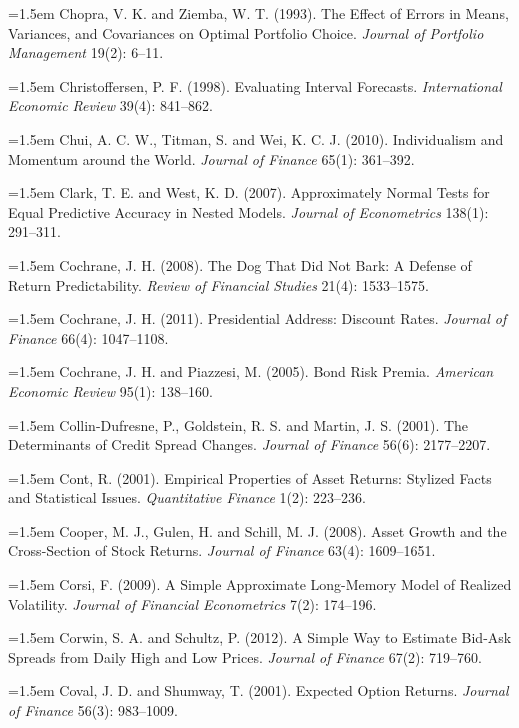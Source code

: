 \hangindent=1.5em Chopra, V. K. and Ziemba, W. T. (1993). The Effect of Errors in Means, Variances, and Covariances on Optimal Portfolio Choice. \emph{Journal of Portfolio Management} 19(2): 6--11.

\hangindent=1.5em Christoffersen, P. F. (1998). Evaluating Interval Forecasts. \emph{International Economic Review} 39(4): 841--862.

\hangindent=1.5em Chui, A. C. W., Titman, S. and Wei, K. C. J. (2010). Individualism and Momentum around the World. \emph{Journal of Finance} 65(1): 361--392.

\hangindent=1.5em Clark, T. E. and West, K. D. (2007). Approximately Normal Tests for Equal Predictive Accuracy in Nested Models. \emph{Journal of Econometrics} 138(1): 291--311.

\hangindent=1.5em Cochrane, J. H. (2008). The Dog That Did Not Bark: A Defense of Return Predictability. \emph{Review of Financial Studies} 21(4): 1533--1575.

\hangindent=1.5em Cochrane, J. H. (2011). Presidential Address: Discount Rates. \emph{Journal of Finance} 66(4): 1047--1108.

\hangindent=1.5em Cochrane, J. H. and Piazzesi, M. (2005). Bond Risk Premia. \emph{American Economic Review} 95(1): 138--160.

\hangindent=1.5em Collin-Dufresne, P., Goldstein, R. S. and Martin, J. S. (2001). The Determinants of Credit Spread Changes. \emph{Journal of Finance} 56(6): 2177--2207.

\hangindent=1.5em Cont, R. (2001). Empirical Properties of Asset Returns: Stylized Facts and Statistical Issues. \emph{Quantitative Finance} 1(2): 223--236.

\hangindent=1.5em Cooper, M. J., Gulen, H. and Schill, M. J. (2008). Asset Growth and the Cross-Section of Stock Returns. \emph{Journal of Finance} 63(4): 1609--1651.

\hangindent=1.5em Corsi, F. (2009). A Simple Approximate Long-Memory Model of Realized Volatility. \emph{Journal of Financial Econometrics} 7(2): 174--196.

\hangindent=1.5em Corwin, S. A. and Schultz, P. (2012). A Simple Way to Estimate Bid-Ask Spreads from Daily High and Low Prices. \emph{Journal of Finance} 67(2): 719--760.

\hangindent=1.5em Coval, J. D. and Shumway, T. (2001). Expected Option Returns. \emph{Journal of Finance} 56(3): 983--1009.

